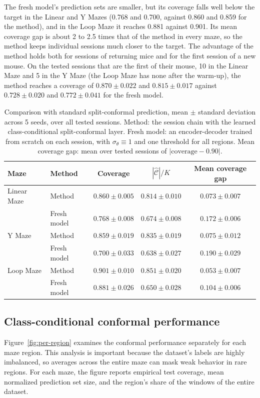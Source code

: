 \documentclass{article}
\begin{document}
The fresh model's prediction sets are smaller, but its coverage falls well below the target in the Linear and Y Mazes (0.768 and 0.700, against 0.860 and 0.859 for the method), and in the Loop Maze it reaches 0.881 against 0.901. Its mean coverage gap is about 2 to 2.5 times that of the method in every maze, so the method keeps individual sessions much closer to the target. The advantage of the method holds both for sessions of returning mice and for the first session of a new mouse. On the tested sessions that are the first of their mouse, 10 in the Linear Maze and 5 in the Y Maze (the Loop Maze has none after the warm-up), the method reaches a coverage of $0.870\pm0.022$ and $0.815\pm0.017$ against $0.728\pm0.020$ and $0.772\pm0.041$ for the fresh model.

\begin{table}[!ht]
  \caption{Comparison with standard split-conformal prediction, mean $\pm$ standard deviation across 5 seeds, over all tested sessions. Method: the session chain with the learned class-conditional split-conformal layer. Fresh model: an encoder-decoder trained from scratch on each session, with $\sigma_\theta\equiv1$ and one threshold for all regions. Mean coverage gap: mean over tested sessions of $|\text{coverage}-0.90|$.}
  \label{tab:baselines}
  \centering
  \footnotesize
  \begin{tabular}{@{}l l *{3}{c}@{}}
    \toprule
    Maze & Method & Coverage & $|\widehat{\mathcal{C}}|/K$ & Mean coverage gap \\
    \midrule
    Linear Maze & Method      & $0.860\pm0.005$ & $0.814\pm0.010$ & $0.073\pm0.007$ \\
                & Fresh model & $0.768\pm0.008$ & $0.674\pm0.008$ & $0.172\pm0.006$ \\
    \midrule
    Y Maze      & Method      & $0.859\pm0.019$ & $0.835\pm0.019$ & $0.075\pm0.012$ \\
                & Fresh model & $0.700\pm0.033$ & $0.638\pm0.027$ & $0.190\pm0.029$ \\
    \midrule
    Loop Maze   & Method      & $0.901\pm0.010$ & $0.851\pm0.020$ & $0.053\pm0.007$ \\
                & Fresh model & $0.881\pm0.026$ & $0.650\pm0.028$ & $0.104\pm0.006$ \\
    \bottomrule
  \end{tabular}
\end{table}

\FloatBarrier
\subsection{Class-conditional conformal performance}
Figure~\ref{fig:per-region} examines the conformal performance separately for each maze region. This analysis is important because the dataset's labels are highly imbalanced, so averages across the entire maze can mask weak behavior in rare regions. For each maze, the figure reports empirical test coverage, mean normalized prediction set size, and the region's share of the windows of the entire dataset.
\end{document}
